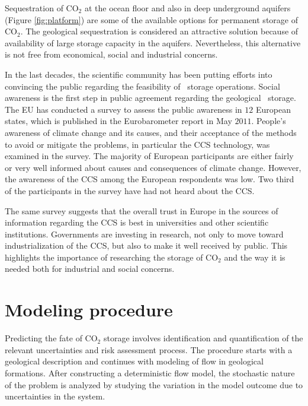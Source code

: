 Sequestration of CO$_2$ at the ocean floor and also in deep underground aquifers (Figure \ref{fig:platform}) are some of the available options for permanent storage of $\mbox{CO}_2$. The geological sequestration is considered an attractive solution because of availability of large storage capacity in the aquifers. Nevertheless, this alternative is not free from economical, social and industrial concerns.  

In the last decades, the scientific community has been putting efforts into
convincing the public regarding the feasibility of \coo\ storage operations. Social awareness is the first step in public agreement regarding the geological \coo\ storage. The EU has conducted a survey to assess the public awareness in $12$ European states, which is published in the Eurobarometer report in May $2011$. People's awareness of climate change and its causes, and their acceptance of the methods to avoid or mitigate the problems, in particular the CCS technology, was examined in the survey. The majority of European participants are either fairly or very well informed about causes and consequences of climate change. However, the awareness of the CCS among the European respondents was low. Two third of the participants in the survey have had not heard about the CCS. 

The same survey suggests that the overall trust in Europe in the sources of
information regarding  the CCS is best in universities and other scientific
institutions. Governments are investing in research, not only to move toward
industrialization of the CCS, but also to make it well received by public. This
highlights the importance of researching the storage of $\mbox{CO}_2$ and the
way it is needed both for industrial and social concerns.

\section{Modeling procedure}
\label{sec:MProcedure}

Predicting the fate of $\mbox{CO}_2$ storage involves identification and
quantification of the  relevant uncertainties and risk assessment process. The
procedure starts with a geological description and continues with modeling of
flow in geological formations. After constructing a deterministic flow model,
the stochastic nature of the problem is analyzed by studying the variation in
the model outcome due to uncertainties in the system. 

